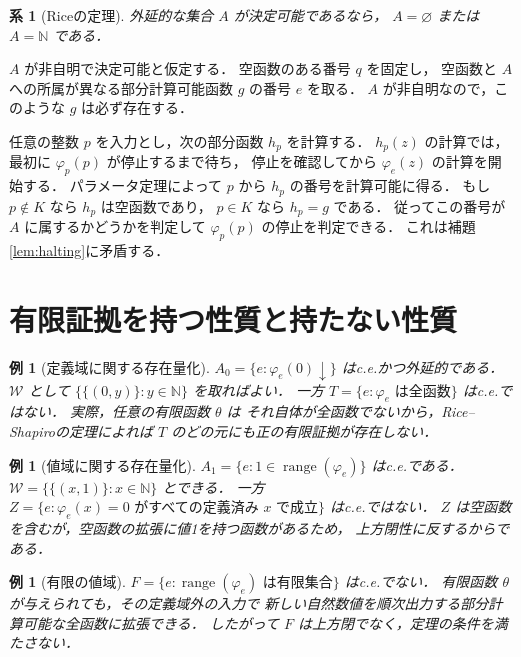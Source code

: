 \documentclass[a5paper,10pt,onecolumn]{jsarticle}
\makeatletter
\theoremstyle{mathnotetheorem}
\newtheorem{corollary}[theorem]{系}
\newtheorem{example}[theorem]{例}
\renewcommand{\proofname}{証明}
\renewenvironment{proof}[1][\proofname]{%
  \par\pushQED{\qed}\normalfont\topsep4\p@\@plus2\p@\relax
  \trivlist\item[\hskip\labelsep\bfseries #1]\ignorespaces
}{\popQED\endtrivlist\@endpefalse}
\makeatother
\begin{document}
\begin{corollary}[Riceの定理]\label{cor:rice}
外延的な集合 $A$ が決定可能であるなら，
$A=\varnothing$ または $A=\mathbb N$ である．
\end{corollary}
\begin{proof}
$A$ が非自明で決定可能と仮定する．
空函数のある番号 $q$ を固定し，
空函数と $A$ への所属が異なる部分計算可能函数 $g$ の番号 $e$ を取る．
$A$ が非自明なので，このような $g$ は必ず存在する．

任意の整数 $p$ を入力とし，次の部分函数 $h_p$ を計算する．
$h_p(z)$ の計算では，最初に $\varphi_p(p)$ が停止するまで待ち，
停止を確認してから $\varphi_e(z)$ の計算を開始する．
パラメータ定理によって $p$ から $h_p$ の番号を計算可能に得る．
もし $p\notin K$ なら $h_p$ は空函数であり，
$p\in K$ なら $h_p=g$ である．
従ってこの番号が $A$ に属するかどうかを判定して
$\varphi_p(p)$ の停止を判定できる．
これは補題\ref{lem:halting}に矛盾する．
\end{proof}

\section{有限証拠を持つ性質と持たない性質}
\begin{example}[定義域に関する存在量化]
$A_0=\{e:\varphi_e(0)\downarrow\}$ はc.e.かつ外延的である．
$\mathcal W$ として
$\{\{(0,y)\}:y\in\mathbb N\}$ を取ればよい．
一方 $T=\{e:\varphi_e\text{ は全函数}\}$ はc.e.ではない．
実際，任意の有限函数 $\theta$ は
それ自体が全函数でないから，Rice--Shapiroの定理によれば
$T$ のどの元にも正の有限証拠が存在しない．
\end{example}

\begin{example}[値域に関する存在量化]
$A_1=\{e:1\in\operatorname{range}(\varphi_e)\}$ はc.e.である．
$\mathcal W=\{\{(x,1)\}:x\in\mathbb N\}$ とできる．
一方 $Z=\{e:\varphi_e(x)=0\text{ がすべての定義済み }x
\text{ で成立}\}$ はc.e.ではない．
$Z$ は空函数を含むが，空函数の拡張に値1を持つ函数があるため，
上方閉性に反するからである．
\end{example}

\begin{example}[有限の値域]
$F=\{e:\operatorname{range}(\varphi_e)\text{ は有限集合}\}$ はc.e.でない．
有限函数 $\theta$ が与えられても，その定義域外の入力で
新しい自然数値を順次出力する部分計算可能な全函数に拡張できる．
したがって $F$ は上方閉でなく，定理の条件を満たさない．
\end{example}
\end{document}
